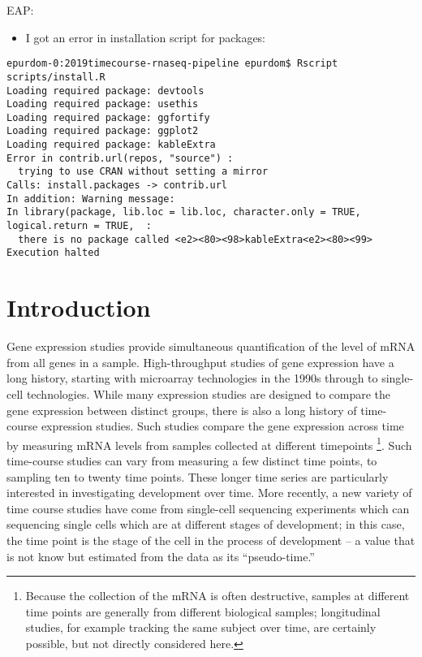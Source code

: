 \documentclass[9pt,a4paper,]{extarticle}
\begin{document}
EAP:

\begin{itemize}
\tightlist
\item
  I got an error in installation script for packages:
\end{itemize}

\begin{verbatim}
epurdom-0:2019timecourse-rnaseq-pipeline epurdom$ Rscript scripts/install.R
Loading required package: devtools
Loading required package: usethis
Loading required package: ggfortify
Loading required package: ggplot2
Loading required package: kableExtra
Error in contrib.url(repos, "source") : 
  trying to use CRAN without setting a mirror
Calls: install.packages -> contrib.url
In addition: Warning message:
In library(package, lib.loc = lib.loc, character.only = TRUE, logical.return = TRUE,  :
  there is no package called <e2><80><98>kableExtra<e2><80><99>
Execution halted
\end{verbatim}

\hypertarget{introduction}{%
\section{Introduction}\label{introduction}}

Gene expression studies provide simultaneous quantification of the level of
mRNA from all genes in a sample. High-throughput studies of gene expression
have a long history, starting with microarray technologies in the 1990s
through to single-cell technologies. While many expression studies are
designed to compare the gene expression between distinct groups, there is also a
long history of time-course expression studies. Such studies compare the
gene expression
across time by measuring mRNA levels from samples collected at different
timepoints \footnote{Because the collection of the mRNA is often destructive, samples at
  different time points are generally from different biological samples;
  longitudinal studies, for example tracking the same subject over time, are
  certainly possible, but not directly considered here.}. Such time-course studies can vary from measuring a few
distinct time
points, to sampling ten to twenty time points. These longer time series are
particularly interested in investigating development over time. More recently,
a new variety of time course studies have come from single-cell sequencing experiments
\citep{shalek:single-cell, habib:div-seq, trapnell:dynamics}
which can sequencing single cells which are at different stages of development; in this case,
the time point is the stage of the cell in the process of development -- a
value that is not know but estimated from the data as its ``pseudo-time.''
\end{document}
